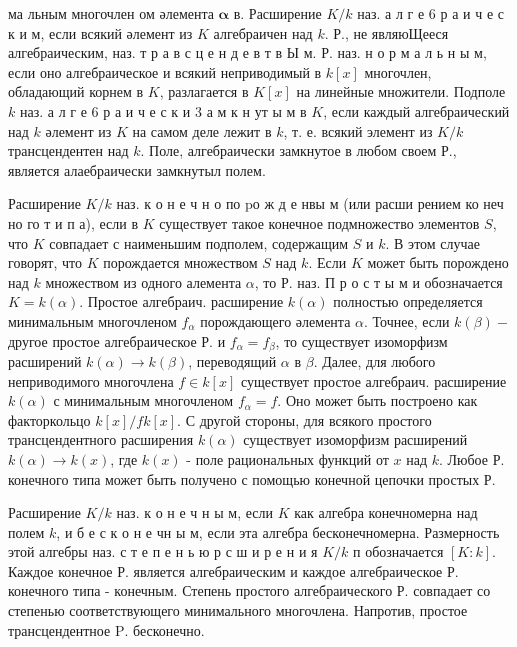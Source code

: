 \documentclass[10pt]{article}
\begin{document}
ма льным многочлен ом әлемента $\boldsymbol{\alpha}$ в. Расширение $K / k$ наз. а л г е 6 р а и ч е с к и м, если всякий әлемент из $K$ алгебраичен над $k$. Р., не являюЩееся алгебраическим, наз. т р а в с ц е н д е в т в Ы м. Р. наз. н о р м а л ь н ы м, если оно алгебраическое и всякий неприводимый в $k[x]$ многочлен, обладающий корнем в $K$, разлагается в $K[x]$ на линейные множители. Подполе $k$ наз. а л г е 6 р а и ч е с к и 3 а м к н ут ы м в $K$, если каждый алгебраический над $k$ әлемент из $K$ на самом деле лежит в $k$, т. е. всякий элемент из $K / k$ трансцендентен над $k$. Поле, алгебраически замкнутое в любом своем Р., является алаебраически замкнутыл полем.



Расширение $K / k$ наз. к о н е ч н о по $\mathrm{p} о$ ж д е нвы м (или расши рением ко неч но го т и п а), если в $K$ существует такое конечное подмножество элементов $S$, что $K$ совпадает с наименьшим подполем, содержащим $S$ и $k$. В этом случае говорят, что $K$ порождается множеством $S$ над $k$. Если $K$ может быть порождено над $k$ множеством из одного алемента $\alpha$, то Р. наз. П р о с т ы м и обозначается $K=k(\alpha)$. Простое алгебраич. расширение $k(\alpha)$ полностью определяется минимальным многочленом $f_{\alpha}$ порождающего әлемента $\alpha$. Точнее, если $k(\beta)-$ другое простое алгебраическое Р. и $f_{\alpha}=f_{\beta}$, то существует изоморфизм расширений $k(\alpha) \rightarrow k(\beta)$, переводящий $\alpha$ в $\beta$. Далее, для любого неприводимого многочлена $f \in k[x]$ существует простое алгебраич. расширение $k(\alpha)$ с минимальным многочленом $f_{\alpha}=f$. Оно может быть построено как факторкольцо $k[x] / f k[x]$. С другой стороны, для всякого простого трансцендентного расширения $k(\alpha)$ существует изоморфизм расширений $k(\alpha) \rightarrow k(x)$, где $k(x)$ - поле рациональных функций от $x$ над $k$. Любое Р. конечного типа может быть получено с помощью конечной цепочки простых Р.



Расширение $K / k$ наз. к о н е ч н ы м, если $K$ как алгебра конечномерна над полем $k$, и б е с к о н е чн ы м, если эта алгебра бесконечномерна. Размерность этой алгебры наз. с т е п е н ь ю р с ш и р е н и я $K / k$ п обозначается $[K: k]$. Каждое конечное Р. является алгебраическим и каждое алгебраическое Р. конечного типа - конечным. Степень простого алгебраического Р. совпадает со степенью соответствующего минимального многочлена. Напротив, простое трансцендентное $\mathrm{P}$. бесконечно.
\end{document}
